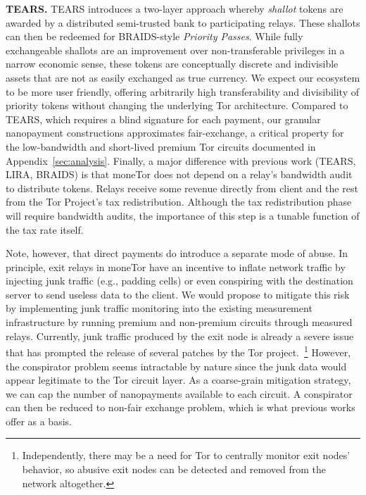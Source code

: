 \medskip\noindent\textbf{TEARS.}
TEARS introduces a two-layer approach whereby \emph{shallot} tokens are awarded by a distributed semi-trusted bank to participating relays.
These shallots can then be redeemed for BRAIDS-style \emph{Priority Passes}.
While fully exchangeable shallots are an improvement over non-transferable privileges in a narrow economic sense, these tokens are conceptually discrete and indivisible assets that are not as easily exchanged as true currency.
We expect our ecosystem to be more user friendly, offering arbitrarily high transferability and divisibility of priority tokens without changing the underlying Tor architecture.
Compared to TEARS, which requires a blind signature for each payment, our granular nanopayment constructions approximates fair-exchange, a critical property for the low-bandwidth and short-lived premium Tor circuits documented in Appendix~\ref{sec:analysis}.
Finally, a major difference with previous work (TEARS, LIRA, BRAIDS) is that moneTor does not depend on a relay's bandwidth audit to distribute tokens.
Relays receive some revenue directly from client and the rest from the Tor Project's tax redistribution.
Although the tax redistribution phase will require bandwidth audits, the importance of this step is a tunable function of the tax rate itself.

Note, however, that direct payments do introduce a separate mode of abuse.
In principle, exit relays in moneTor have an incentive to inflate network traffic by injecting junk traffic (e.g., padding cells) or even conspiring with the destination server to send useless data to the client.
We would propose to mitigate this risk by implementing junk traffic monitoring into the existing measurement infrastructure by running premium and non-premium circuits through measured relays.
Currently, junk traffic produced by the exit node is already a severe issue~\cite{rochet2018dropping} that has prompted the release of several patches by the Tor project.~\footnote{Independently, there may be a need for Tor to centrally monitor exit nodes' behavior, so abusive exit nodes can be detected and removed from the network altogether.}
However, the conspirator problem seems intractable by nature since the junk data would appear legitimate to the Tor circuit layer.
As a coarse-grain mitigation strategy, we can cap the number of nanopayments available to each circuit.
A conspirator can then be reduced to non-fair exchange problem, which is what previous works offer as a basis.
